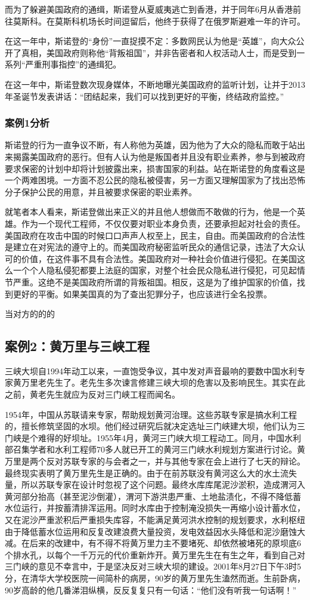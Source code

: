 \documentclass[a4paper,12pt]{ctexart}
\begin{document}
而为了躲避美国政府的通缉，斯诺登从夏威夷逃亡到香港，并于同年6月从香港前往莫斯科。在莫斯科机场长时间逗留后，他终于获得了在俄罗斯避难一年的许可。

在这一年中，斯诺登的“身份”一直捉摸不定：多数网民认为他是“英雄”，向大众公开了真相，美国政府则称他“背叛祖国”，并非告密者和人权活动人士，而是受到一系列“严重刑事指控”的通缉犯。

在这一年中，斯诺登数次现身媒体，不断地曝光美国政府的监听计划，让并于2013年圣诞节发表讲话：“团结起来，我们可以找到更好的平衡，终结政府监控。”
\subsubsection{案例1分析}
斯诺登的行为一直争议不断，有人称他为英雄，因为他为了大众的隐私而敢于站出来揭露美国政府的恶行。但有人认为他是叛国者并且没有职业素养，参与到被政府要求保密的计划中却将计划披露出来，损害国家的利益。站在斯诺登的角度看这是一个两难困境。一方面不忍公民的隐私被侵害，另一方面又理解国家为了找出恐怖分子保护公民的用意，并且被要求保密的职业素养。

就笔者本人看来，斯诺登做出来正义的并且他人想做而不敢做的行为，他是一个英雄。作为一个现代工程师，不仅仅要对职业本身负责，还要承担起对社会的责任。美国政府在攻击中国的时候口口声声人权至上，民主，自由。而美国政府的合法性是建立在对宪法的遵守上的。而美国政府秘密监听民众的通信记录，违法了大众认可的价值，在这件事不具有合法性。美国政府对一种社会价值进行侵犯。在美国这么一个个人隐私侵犯都要上法庭的国家，对整个社会民众隐私进行侵犯，可见起情节严重。这绝不是美国政府所谓的背叛祖国。相反，这是为了维护国家的价值，找到更好的平衡。如果美国真的为了查出犯罪分子，也应该进行全名投票。

   当对方的的的


\subsection{案例2：黄万里与三峡工程}
三峡大坝自1994年动工以来，一直饱受争议，其中发对声音最响的要数中国水利专家黄万里老先生了。老先生多次谏言修建三峡大坝的危害以及影响民生。其实在此之前，黄老先生就应为反对三门峡工程而闻名。

1954年，中国从苏联请来专家，帮助规划黄河治理。这些苏联专家是搞水利工程的，擅长修筑坚固的水坝。他们经过研究后就决定选址三门峡建大坝，他们认为三门峡是个难得的好坝址。1955年4月，黄河三门峡大坝工程动工。同月，中国水利部召集学者和水利工程师70多人就已开工的黄河三门峡水利规划方案进行讨论。黄万里是两个反对苏联专家的与会者之一，并与其他专家在会上进行了七天的辩论。最终现实表明了黄万里先生是正确的。由于在前苏联没有黄河这么大的水土流失量，所以苏联专家在设计时忽视了这个问题。最终水库库尾泥沙淤积，造成渭河入黄河部分抬高（甚至泥沙倒灌），渭河下游洪患严重、土地盐渍化，不得不降低蓄水位运行，并按蓄清排浑运用。同时水库由于控制淹没损失一再缩小设计蓄水位，又在泥沙严重淤积后严重损失库容，不能满足黄河洪水控制的规划要求，水利枢纽由于降低蓄水位运用和反复改建浪费大量投资，发电效益因水头降低和泥沙磨蚀大减。在后来的改建中，有不得不将黄万里力主不要堵死、却依然被堵死的原坝底6个排水孔，以每个一千万元的代价重新炸开。黄万里先生在有生之年，看到自己对三门峡的意见不幸言中，于是坚决反对三峡大坝的建设。2001年8月27日下午3时5分，在清华大学校医院一间简朴的病房，90岁的黄万里先生溘然而逝。生前卧病，90岁高龄的他几番涕泪纵横，反反复复只有一句话：“他们没有听我一句话啊！”
\end{document}
